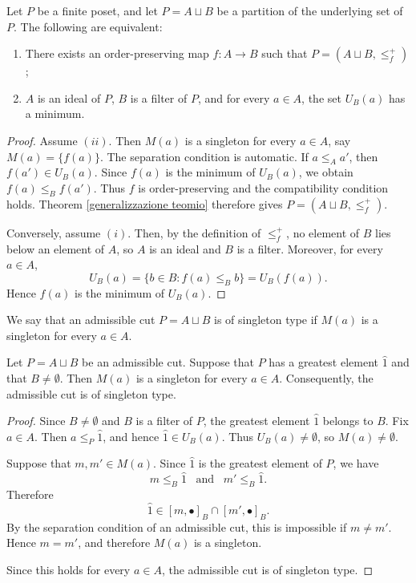 \begin{corollary} %
\label{Reconstructing a poset from a cut}
Let $P$ be a finite poset, and let $P=A \sqcup B$ be a partition of the underlying set of $P$.
The following are equivalent: \begin{enumerate}
    \item There exists an order-preserving map $f \colon A \to B$ such that $P=(A \sqcup B, \leq_f^+)$;
    \item $A$ is an ideal of $P$, $B$ is a filter of $P$, and for every $a \in A$, the set $U_B(a)$ has a minimum.
\end{enumerate}

\end{corollary} 
\begin{proof}
Assume $(ii)$. Then $M(a)$ is a singleton for every $a \in A$, say $M(a)=\{f(a)\}$. The separation condition is automatic. If $a \leq_Aa'$, then $f(a') \in U_B(a)$. Since $f(a)$ is the minimum of $U_B(a)$, we obtain $f(a) \leq_Bf(a')$. Thus $f$ is order-preserving and the compatibility condition holds. Theorem \ref{generalizzazione teomio} therefore gives $P=(A \sqcup B, \leq_f^+)$.

Conversely, assume $(i)$. Then, by the definition of $\leq_f^+$, no element of $B$ lies below an element of $A$, so $A$ is an ideal and $B$ is a filter. Moreover, for every $a \in A$, 
\[U_B(a)=\{b \in B \colon f(a) \leq_Bb\}=U_B(f(a)).\]
Hence $f(a)$ is the minimum of $U_B(a)$.

\end{proof}

We say that an admissible cut $P=A \sqcup B$ is of singleton type if $M(a)$ is a singleton for every $a \in A$.
\\[0.8 cm]
\begin{corollary} \label{cornuovo}
    Let $P=A \sqcup B$ be an admissible cut. Suppose that $P$ has a greatest element $\hat{1}$ and that $B \neq \emptyset$. Then  $M(a)$ is a singleton for every $a \in A$. Consequently, the admissible cut is of singleton type.
\end{corollary}

\begin{proof}
Since $B \neq \emptyset$ and $B$ is a filter of $P$, the greatest element $\hat{1}$ belongs to $B$. Fix $a \in A$. Then $a \leq_P \hat{1}$, and hence $\hat{1}\in U_B(a)$. Thus $U_B(a) \neq \emptyset$, so $M(a) \neq \emptyset$. 

    Suppose that $m, m' \in M(a)$. Since $ \hat{1}$ is the greatest element of $P$, we have \[m \leq_B \hat{1} \,\,\, \text{ and }\,\,\, m' \leq_B \hat{1}.\] Therefore \[\hat{1} \in [m, \bullet]_B \cap [m', \bullet]_B.\] By the separation condition of an admissible cut, this is impossible if $m \neq m'$. Hence $m=m'$, and therefore $M(a)$ is a singleton. 

    Since this holds for every $a \in A$, the admissible cut is of singleton type.
\end{proof}

